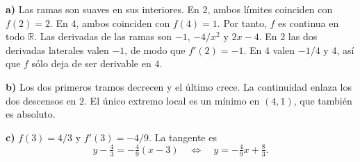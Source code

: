 \textbf{a)} Las ramas son suaves en sus interiores. En $2$, ambos límites coinciden con $f(2)=2$. En $4$, ambos coinciden con $f(4)=1$. Por tanto, $f$ es continua en todo $\mathbb R$. Las derivadas de las ramas son $-1$, $-4/x^2$ y $2x-4$. En $2$ las dos derivadas laterales valen $-1$, de modo que $f'(2)=-1$. En $4$ valen $-1/4$ y $4$, así que $f$ sólo deja de ser derivable en $4$.

\textbf{b)} Los dos primeros tramos decrecen y el último crece. La continuidad enlaza los dos descensos en $2$. El único extremo local es un mínimo en $(4,1)$, que también es absoluto.

\textbf{c)} $f(3)=4/3$ y $f'(3)=-4/9$. La tangente es
\[
y-\tfrac43=-\tfrac49(x-3)
\quad\Longleftrightarrow\quad
\boxed{y=-\tfrac49x+\tfrac83}.
\]
